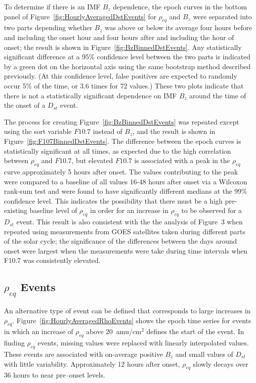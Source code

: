 \documentclass[12pt]{article}
\begin{document}
To determine if there is an IMF $B_{z}$ dependence, the epoch curves in the bottom panel of Figure~\ref{fig:HourlyAveragedDstEvents} for $\rho_{eq}$ and $B_{z}$ were separated into two parts depending whether $B_z$ was above or below its average four hours before and including the onset hour and four hours after and including the hour of onset; the result is shown in Figure~\ref{fig:BzBinnedDstEvents}. Any statistically significant difference at a 95\% confidence level between the two parts is indicated by a green dot on the horizontal axis using the same bootstrap method described previously.  (At this confidence level, false positives are expected to randomly occur 5\% of the time, or 3.6 times for 72 values.)  These two plots indicate that there is not a statistically significant dependence on IMF $B_{z}$ around the time of the onset of a $D_{st}$ event.

The process for creating Figure~\ref{fig:BzBinnedDstEvents} was repeated except using the sort variable $F10.7$ instead of $B_z$, and the result is shown in Figure~\ref{fig:F107BinnedDstEvents}. The difference between the epoch curves is statistically significant at all times, as expected due to the high correlation between $\rho_{eq}$ and $F10.7$, but elevated $F10.7$ is associated with a peak in the $\rho_{eq}$ curve approximately 5 hours after onset. The values contributing to the peak were compared to a baseline of all values 16-48 hours after onset via a Wilcoxon rank-sum test and were found to have significantly different medians at the 99\% confidence level.  This indicates the possibility that there must be a high pre-existing baseline level of $\rho_{eq}$ in order for an increase in $\rho_{eq}$ to be observed for a $D_{st}$ event.  This result is also consistent with the the analysis of Figure~3 when repeated using measurements from GOES satellites taken during different parts of the solar cycle; the significance of the differences between the days around onset were largest when the measurements were take during time intervals when F10.7 was consistently elevated.

\subsection{$\rho_{eq}$ Events}

An alternative type of event can be defined that corresponds to large increases in $\rho_{eq}$.  Figure~\ref{fig:HourlyAveragedRhoEvents} shows the epoch time series for events in which an increase of $\rho_{eq}$ above $20$~amu/cm$^2$ defines the start of the event. In finding $\rho_{eq}$ events, missing values were replaced with linearly interpolated values.  These events are associated with on-average positive $B_z$ and small values of $D_{st}$ with little variability.  Approximately 12 hours after onset, $\rho_{eq}$ slowly decays over 36 hours to near pre--onset levels.  
\end{document}

